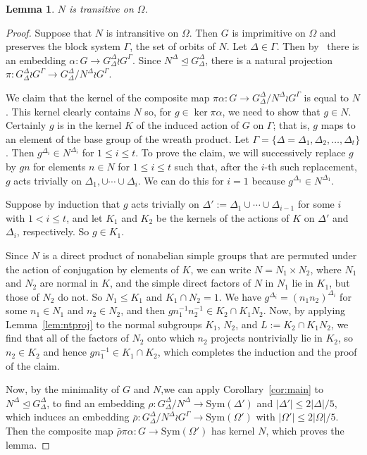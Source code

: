 \documentclass[12pt,a4paper]{article}
\newcommand{\Sym}{\mathrm{Sym}}
\newtheorem{lemma}[theorem]{Lemma} %
\begin{document}
\begin{lemma} $N$ is transitive on $\Omega$.
\end {lemma}
\begin{proof}
Suppose that $N$ is intransitive on $\Omega$. Then $G$ is imprimitive on
$\Omega$ and preserves the block system $\Gamma$, the set of orbits of $N$.
Let $\Delta \in \Gamma$.  Then by~\cite[Theorem 1.8]{Cameron} there is an
embedding $\alpha: G \to G_{\Delta}^\Delta \wr G^\Gamma$. Since
$N^\Delta \unlhd G_{\Delta}^\Delta$, there is a natural projection
$\pi: G_{\Delta}^\Delta \wr G^\Gamma \to
G_{\Delta}^\Delta/N^\Delta \wr G^\Gamma$.

We claim that the kernel of the composite map
$\pi\alpha:G \to G_{\Delta}^\Delta/N^\Delta \wr G^\Gamma$ is equal to $N$.
This kernel clearly contains $N$ so, for $g \in \ker \pi\alpha$, we need to
show that $g \in N$. Certainly $g$ is in the kernel $K$ of the induced action
of $G$ on $\Gamma$; that is, $g$ maps to an element of the base group of the
wreath product. Let $\Gamma = \{ \Delta=\Delta_1,\Delta_2,\ldots,\Delta_t\}$.
Then $g^{\Delta_i} \in N^{\Delta_i}$ for $1 \le i \le t$.
To prove the claim, we will successively replace $g$ by $gn$ for elements
$n \in N$ for $1 \le i \le t$ such that, after the $i$-th such replacement,
$g$ acts trivially on $\Delta_1, \cup  \cdots \cup \Delta_i$.
We can do this for $i=1$ because $g^{\Delta_1} \in N^{\Delta_1}$.

Suppose by induction that $g$ acts trivially on
$\Delta' := \Delta_1 \cup \cdots \cup \Delta_{i-1}$ for some $i$ with
$1 < i \le t$, and let $K_1$ and $K_2$ be the kernels of the actions of $K$
on $\Delta'$ and $\Delta_i$, respectively. So $g \in K_1$.

Since $N$ is a direct product of nonabelian simple groups that are permuted
under the action of conjugation by elements of $K$, we can write
$N = N_1 \times N_2$, where $N_1$ and $N_2$ are normal in $K$, and the simple
direct factors of $N$ in $N_1$ lie in $K_1$, but those of $N_2$ do not.
So $N_1 \le K_1$ and $K_1 \cap N_2 = 1$.
We have $g^{\Delta_i} = (n_1n_2)^{\Delta_i}$
for some $n_1 \in N_1$ and $n_2 \in N_2$, and then
$gn_1^{-1}n_2^{-1} \in K_2 \cap K_1N_2$.
Now, by applying Lemma~\ref{lem:ntproj} to the normal subgroups $K_1$, $N_2$,
and $L := K_2 \cap K_1N_2$, we find that all of the factors of $N_2$ onto which
$n_2$ projects nontrivially lie in $K_2$, so $n_2 \in K_2$ and hence
$gn_1^{-1} \in K_1 \cap K_2$,
which completes the induction and the proof of the claim.

Now, by the minimality of $G$ and $N$,we can apply Corollary~\ref{cor:main} to
$N^\Delta \unlhd G_{\Delta}^\Delta$, to find an embedding
$\rho: G_{\Delta}^\Delta/N^\Delta \to \Sym(\Delta')$
and $|\Delta'| \le 2|\Delta|/5$, which induces an embedding
$\bar{\rho} : G_{\Delta}^\Delta/N^\Delta \wr G^\Gamma \to \Sym(\Omega')$
with $|\Omega'| \le 2|\Omega|/5$.
Then the composite map $\bar{\rho}\pi\alpha:G \to \Sym(\Omega')$ has
kernel $N$, which proves the lemma.
\end{proof}
\end{document}

